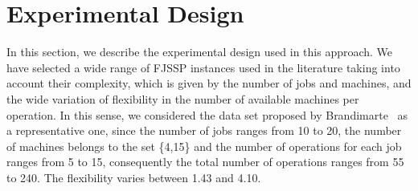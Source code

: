 \section{Experimental Design}
\vspace{-0.4cm}
In this section, we describe the experimental design used in this approach. We have selected a wide range of FJSSP instances used in the literature taking into account their complexity, which is given by the number of jobs and machines, and the wide variation of flexibility in the number of available machines per operation. In this sense, we considered the data set proposed by Brandimarte~\cite{brandimarte1993} as a representative one, since the number of jobs ranges from 10 to 20, the number of machines belongs to the set \{4,15\} and the number of operations for each job ranges from 5 to 15, consequently the total number of operations ranges from 55 to 240. The flexibility varies between 1.43 and 4.10.


